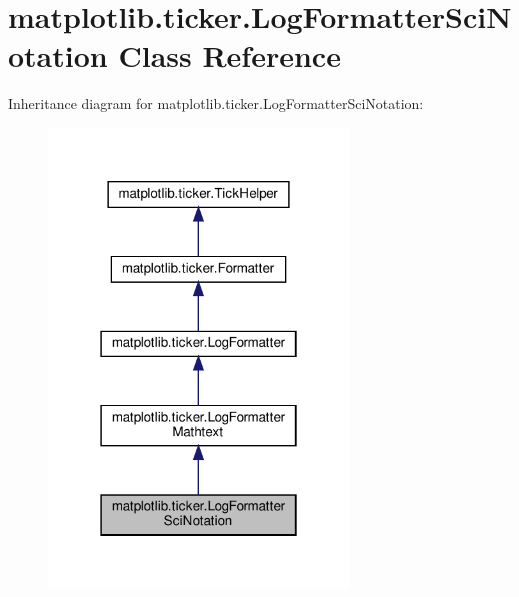 \hypertarget{classmatplotlib_1_1ticker_1_1LogFormatterSciNotation}{}\section{matplotlib.\+ticker.\+Log\+Formatter\+Sci\+Notation Class Reference}
\label{classmatplotlib_1_1ticker_1_1LogFormatterSciNotation}


Inheritance diagram for matplotlib.\+ticker.\+Log\+Formatter\+Sci\+Notation\+:
\nopagebreak
\begin{figure}[H]
\begin{center}
\leavevmode
\includegraphics[width=226pt]{classmatplotlib_1_1ticker_1_1LogFormatterSciNotation__inherit__graph}
\end{center}
\end{figure}


